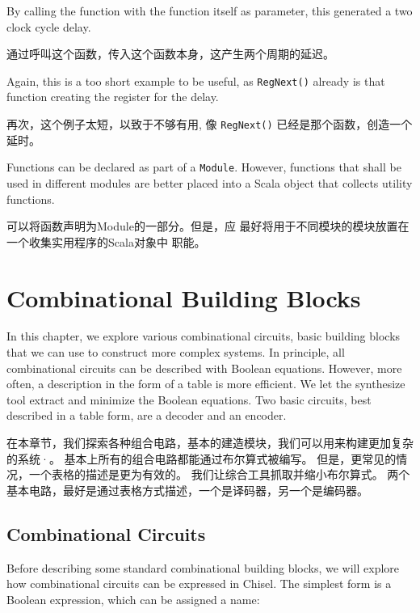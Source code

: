 \documentclass[%
    10pt,
    headinclude, footexclude,
    openright, %
    notitlepage,
    cleardoubleempty,
    headsepline,
    pointlessnumbers,
    bibtotoc, idxtotoc,
    ]{scrbook}
\newcommand{\code}[1]{{\small{\texttt{#1}}}}
\begin{document}

\noindent By calling the function with the function itself as parameter, this generated a two
clock cycle delay.

\noindent 通过呼叫这个函数，传入这个函数本身，这产生两个周期的延迟。


\noindent Again, this is a too short example to be useful, as \code{RegNext()}
already is that function creating the register for the delay.

\noindent 再次，这个例子太短，以致于不够有用, 像 \code{RegNext()}
已经是那个函数，创造一个延时。

Functions can be declared as part of a \code{Module}. However, functions that shall be
used in different modules are better placed into a Scala object that collects utility
functions.

可以将函数声明为Module的一部分。但是，应
最好将用于不同模块的模块放置在一个收集实用程序的Scala对象中
职能。

\chapter{Combinational Building Blocks}

In this chapter, we explore various combinational circuits, basic building blocks that we can
use to construct more complex systems.
In principle, all combinational circuits can be described with Boolean equations.
However, more often, a description in the form of a table is more efficient.
We let the synthesize tool extract and minimize the Boolean equations.
Two basic circuits, best described in a table form, are a decoder and an encoder.

在本章节，我们探索各种组合电路，基本的建造模块，我们可以用来构建更加复杂的系统·。
基本上所有的组合电路都能通过布尔算式被编写。
但是，更常见的情况，一个表格的描述是更为有效的。
我们让综合工具抓取并缩小布尔算式。
两个基本电路，最好是通过表格方式描述，一个是译码器，另一个是编码器。

\section{Combinational Circuits}

Before describing some standard combinational building blocks, we will explore
how combinational circuits can be expressed in Chisel.
The simplest form is a Boolean expression, which can be assigned a name:
\end{document}
